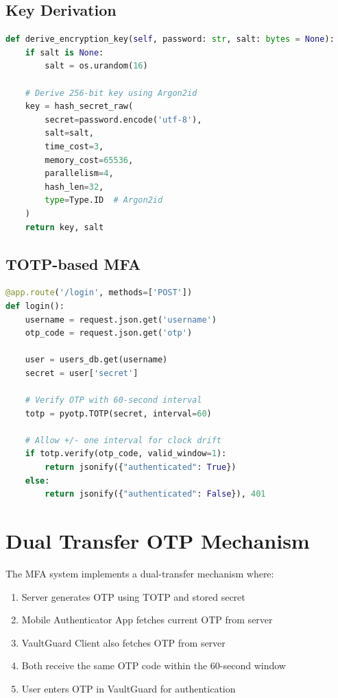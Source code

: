 \documentclass[12pt,a4paper]{report}
\begin{document}
\subsection{Key Derivation}

\begin{lstlisting}[language=Python, caption=Argon2id Key Derivation]
def derive_encryption_key(self, password: str, salt: bytes = None):
    if salt is None:
        salt = os.urandom(16)
    
    # Derive 256-bit key using Argon2id
    key = hash_secret_raw(
        secret=password.encode('utf-8'),
        salt=salt,
        time_cost=3,
        memory_cost=65536,
        parallelism=4,
        hash_len=32,
        type=Type.ID  # Argon2id
    )
    return key, salt
\end{lstlisting}

\subsection{TOTP-based MFA}

\begin{lstlisting}[language=Python, caption=TOTP Verification on MFA Server]
@app.route('/login', methods=['POST'])
def login():
    username = request.json.get('username')
    otp_code = request.json.get('otp')
    
    user = users_db.get(username)
    secret = user['secret']
    
    # Verify OTP with 60-second interval
    totp = pyotp.TOTP(secret, interval=60)
    
    # Allow +/- one interval for clock drift
    if totp.verify(otp_code, valid_window=1):
        return jsonify({"authenticated": True})
    else:
        return jsonify({"authenticated": False}), 401
\end{lstlisting}

\section{Dual Transfer OTP Mechanism}

The MFA system implements a dual-transfer mechanism where:

\begin{enumerate}
    \item Server generates OTP using TOTP and stored secret
    \item Mobile Authenticator App fetches current OTP from server
    \item VaultGuard Client also fetches OTP from server
    \item Both receive the same OTP code within the 60-second window
    \item User enters OTP in VaultGuard for authentication
\end{enumerate}
\end{document}
